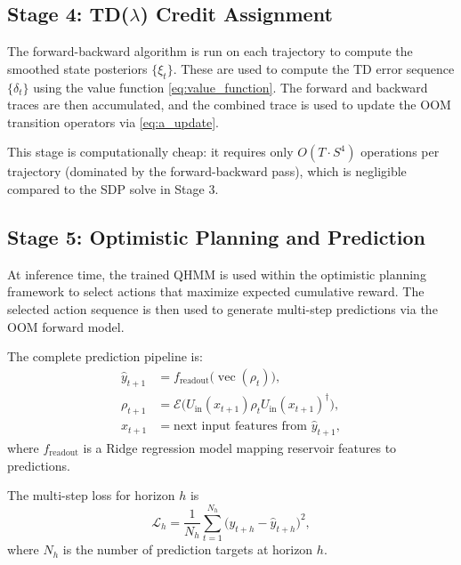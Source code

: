 
\subsection*{Stage 4: TD($\lambda$) Credit Assignment}

The forward-backward algorithm is run on each trajectory to compute the
smoothed state posteriors $\{\xi_t\}$. These are used to compute the
TD error sequence $\{\delta_t\}$ using the value function
\eqref{eq:value_function}. The forward and backward traces are then
accumulated, and the combined trace is used to update the OOM transition
operators via \eqref{eq:a_update}.


This stage is computationally cheap: it requires only $O(T \cdot S^4)$
operations per trajectory (dominated by the forward-backward pass),
which is negligible compared to the SDP solve in Stage 3.


\subsection*{Stage 5: Optimistic Planning and Prediction}

At inference time, the trained QHMM is used within the optimistic
planning framework to select actions that maximize expected cumulative
reward. The selected action sequence is then used to generate
multi-step predictions via the OOM forward model.


The complete prediction pipeline is:
\begin{subequations}
\label{eq:prediction}
\begin{align}
\hat y_{t+1} &= f_{\mathrm{readout}}\bigl(\operatorname{vec}(\rho_t)\bigr), \\
\rho_{t+1} &= \mathcal{E}\bigl(U_{\mathrm{in}}(x_{t+1}) \rho_t U_{\mathrm{in}}(x_{t+1})^\dagger\bigr), \\
x_{t+1} &= \text{next input features from } \hat y_{t+1},
\end{align}
\end{subequations}
where $f_{\mathrm{readout}}$ is a Ridge regression model mapping
reservoir features to predictions.


The multi-step loss for horizon $h$ is
\begin{equation}
\mathcal{L}_h = \frac{1}{N_h} \sum_{t=1}^{N_h}
  \bigl( y_{t+h} - \hat y_{t+h} \bigr)^2,
\end{equation}
where $N_h$ is the number of prediction targets at horizon $h$.
